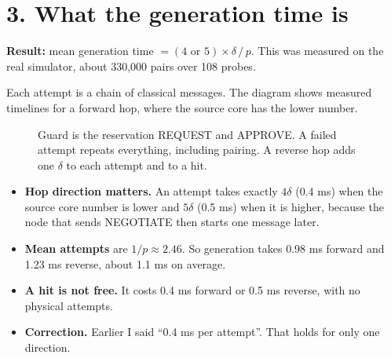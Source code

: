 \documentclass[10.5pt,a4paper]{article}
\begin{document}
\section*{3. What the generation time is}
\textbf{Result:} mean generation time $= (4 \text{ or } 5)\times\delta\,/\,p$. This was measured on the real simulator, about 330,000 pairs over 108 probes.

Each attempt is a chain of classical messages. The diagram shows measured timelines for a forward hop, where the source core has the lower number.

\begin{figure}[H]\centering
{}
\caption{Guard is the reservation REQUEST and APPROVE. A failed attempt repeats everything, including pairing. A reverse hop adds one $\delta$ to each attempt and to a hit.}
\end{figure}

\begin{itemize}\setlength{\itemsep}{1pt}
\item \textbf{Hop direction matters.} An attempt takes exactly $4\delta$ (0.4 ms) when the source core number is lower and $5\delta$ (0.5 ms) when it is higher, because the node that sends NEGOTIATE then starts one message later.
\item \textbf{Mean attempts} are $1/p \approx 2.46$. So generation takes 0.98 ms forward and 1.23 ms reverse, about 1.1 ms on average.
\item \textbf{A hit is not free.} It costs 0.4 ms forward or 0.5 ms reverse, with no physical attempts.
\item \textbf{Correction.} Earlier I said ``0.4 ms per attempt''. That holds for only one direction.
\end{itemize}
\end{document}
